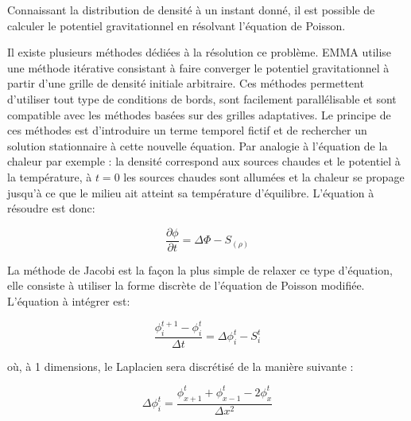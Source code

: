 Connaissant la distribution de densité à un instant donné, il est possible de calculer le potentiel gravitationnel en résolvant l'équation de Poisson.

Il existe plusieurs méthodes dédiées à la résolution ce problème.
EMMA utilise une méthode itérative consistant à faire converger le potentiel gravitationnel à partir d'une grille de densité initiale arbitraire. 
Ces méthodes permettent d'utiliser tout type de conditions de bords, sont facilement parallélisable et sont compatible avec les méthodes basées sur des grilles adaptatives.
Le principe de ces méthodes est d'introduire un terme temporel fictif et de rechercher un solution stationnaire à cette nouvelle équation.
Par analogie à l'équation de la chaleur par exemple : la densité correspond aux sources chaudes et le potentiel à la température, à $t=0$ les sources chaudes sont allumées et la chaleur se propage jusqu'à ce que le milieu ait atteint sa température d'équilibre. 
L'équation à résoudre est donc:

\begin{equation}
\dfrac{\partial \phi}{\partial t} = \Delta \Phi -S_{(\rho)}
\end{equation}

La méthode de Jacobi est la façon la plus simple de relaxer ce type d'équation, elle consiste à utiliser la forme discrète de l'équation de Poisson modifiée. 
L'équation à intégrer est:

\begin{equation}
\dfrac{\phi^{t+1}_i - \phi^{t}_i}{\Delta t}  =  \Delta \phi_i^t - S_i^t
\end{equation}

où, à 1 dimensions, le Laplacien sera discrétisé de la manière suivante :

\begin{equation}
\Delta \phi_i^t = \dfrac{\phi_{x+1}^t  + \phi_{x-1}^t- 2\phi_{x}^t}{\Delta x ^2}
\end{equation}
		

